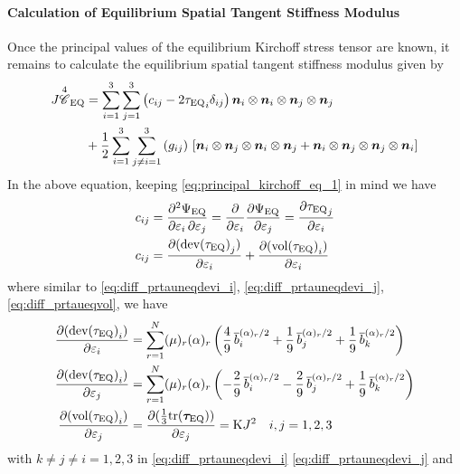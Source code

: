\paragraph*{Calculation of Equilibrium Spatial Tangent Stiffness Modulus} Once the principal values of the equilibrium Kirchoff stress tensor are known, it remains to calculate the equilibrium spatial tangent stiffness modulus \cite[Eq 6.50]{Zienkiewicz2014} given by
\begin{align}
    \nonumber J {\overset{4}{\mathscr{C}}}_{\text{EQ}} 
    &= 
   \sum_{i=1}^{3} \sum_{j=1}^{3}\left( c_{ij} - 2 {{\tau}_{\text{EQ}}}_{i} \delta_{ij} \right) \bm{n}_{i} \otimes \bm{n}_{i} \otimes \bm{n}_{j} \otimes \bm{n}_{j} \\
    &+ \frac{1}{2} \sum_{i=1}^{3} \sum_{j\neq i=1}^{3} \left( g_{ij} \right) \,  \left[\bm{n}_{i} \otimes \bm{n}_{j} \otimes \bm{n}_{i} \otimes \bm{n}_{j} + \bm{n}_{i} \otimes \bm{n}_{j} \otimes \bm{n}_{j} \otimes \bm{n}_{i}\right] \label{eq:Cmat_eq} 
\end{align}
In the above equation, keeping \cref{eq:principal_kirchoff_eq_1} in mind we have
\begin{align}
    \nonumber c_{ij} 
    &= \pdv{\Psi_{\text{EQ}}}{\varepsilon_{{i}}, \varepsilon_{{j}}} 
    = \pdv*{\pdv{\Psi_{\text{EQ}}}{\varepsilon_{{j}}}}{\varepsilon_{{i}}} = \pdv{{{\tau}_{\text{EQ}}}_{j}}{\varepsilon_{{i}}}  \\
    c_{ij}  &=  \pdv{({\text{dev}({\tau}_{\text{EQ}})}_{j})}{\varepsilon_{{i}}} + \pdv{({\text{vol}({\tau}_{\text{EQ}})}_{i})}{\varepsilon_{{i}}}
    \label{eq:c_ij}
\end{align}
where similar to \cref{eq:diff_prtauneqdevi_i}, \cref{eq:diff_prtauneqdevi_j}, \cref{eq:diff_prtaueqvol}, we have 
\begin{align}
    \pdv{({\text{dev}({\tau}_{\text{EQ}})}_{i})}{\varepsilon_{{i}}} 
    &= \sum_{r=1}^{N}(\mu)_{r} (\alpha)_{r} \left(
         \frac{4}{9} \,\overline{b}_{{i}}^{(\alpha)_{r}/2}
        +\frac{1}{9} \,\overline{b}_{{j}}^{(\alpha)_{r}/2}
        +\frac{1}{9} \,\overline{b}_{{k}}^{(\alpha)_{r}/2} \right) \label{eq:diff_prtaueqdevi_i} \\
    \pdv{({\text{dev}({\tau}_{\text{EQ}})}_{i})}{\varepsilon_{{j}}} 
    &= \sum_{r=1}^{N}(\mu)_{r} (\alpha)_{r} \left(
        -\frac{2}{9} \,\overline{b}_{{i}}^{(\alpha)_{r}/2}
        -\frac{2}{9} \,\overline{b}_{{j}}^{(\alpha)_{r}/2}
        +\frac{1}{9} \,\overline{b}_{{k}}^{(\alpha)_{r}/2} \right)\label{eq:diff_prtaueqdevi_j} \\
    \pdv{({\text{vol}({\tau}_{\text{EQ}})}_{i})}{\varepsilon_{{j}}}  
    &= \pdv{(\frac{1}{3}\text{tr}(\bm{\tau}_{\text{EQ}}))}{\varepsilon_{{j}}} 
    = \mathrm{K} J^{2} \quad i,j = 1,2,3 \label{eq:diff_prtaueqvol}
\end{align}
with \(k \neq j \neq i = 1,2,3\) in \cref{eq:diff_prtauneqdevi_i} \cref{eq:diff_prtauneqdevi_j} and 
